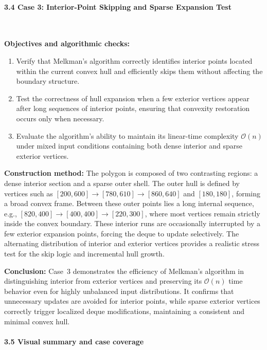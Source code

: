 \documentclass{article}
\begin{document}
\paragraph{3.4 Case 3: Interior-Point Skipping and Sparse Expansion Test}\

\textbf{Objectives and algorithmic checks:}\

\begin{enumerate}
    \item Verify that Melkman’s algorithm correctly identifies interior points located within the current convex hull and efficiently skips them without affecting the boundary structure.
    \item Test the correctness of hull expansion when a few exterior vertices appear after long sequences of interior points, ensuring that convexity restoration occurs only when necessary.
    \item Evaluate the algorithm’s ability to maintain its linear-time complexity $\mathcal{O}(n)$ under mixed input conditions containing both dense interior and sparse exterior vertices.
\end{enumerate}

\textbf{Construction method:}
The polygon is composed of two contrasting regions: a dense interior section and a sparse outer shell. The outer hull is defined by vertices such as $[200,600] \rightarrow [780,610] \rightarrow [860,640]$ and $[180,180]$, forming a broad convex frame. Between these outer points lies a long internal sequence, e.g., $[820,400] \rightarrow [400,400] \rightarrow [220,300]$, where most vertices remain strictly inside the convex boundary. These interior runs are occasionally interrupted by a few exterior expansion points, forcing the deque to update selectively. The alternating distribution of interior and exterior vertices provides a realistic stress test for the skip logic and incremental hull growth.

\textbf{Conclusion:}
Case~3 demonstrates the efficiency of Melkman’s algorithm in distinguishing interior from exterior vertices and preserving its $\mathcal{O}(n)$ time behavior even for highly unbalanced input distributions. 
It confirms that unnecessary updates are avoided for interior points, while sparse exterior vertices correctly trigger localized deque modifications, maintaining a consistent and minimal convex hull.

\paragraph{3.5 Visual summary and case coverage}\  
\end{document}
